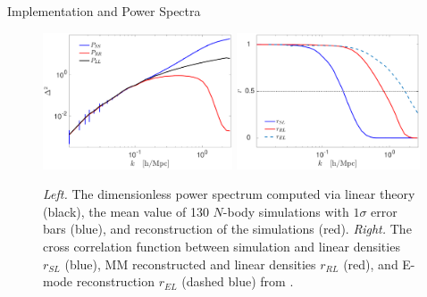 \begin{section}{Implementation and Power Spectra}
  \begin{figure}
    \centering
    \includegraphics[width=0.5\textwidth]{fig2a.pdf}
    \includegraphics[width=0.485\textwidth]{fig2b.pdf}
    \caption{{\it Left.} The dimensionless power spectrum computed via
      linear theory (black), the mean value of 130 $N$-body
      simulations with $1\sigma$ error bars (blue), and reconstruction
      of the simulations (red).  {\it Right.} The cross correlation
      function between simulation and linear densities $r_{SL}$ (blue),
      MM reconstructed and linear densities $r_{RL}$ (red), and E-mode reconstruction $r_{EL}$ (dashed
      blue) from \citet{bib:Yu2016}.}
    \label{fig:cp}
  \end{figure}


\end{section}

